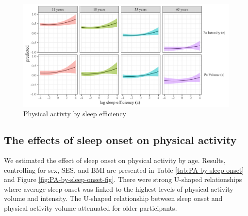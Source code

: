 \documentclass[
  man]{apa6}
\begin{document}
\begin{figure}
\includegraphics[width=1.1\linewidth]{../Figures/Pa on sleep_efficiency_lag} \caption{Physical activty by sleep efficiency}\label{fig:PA-by-sleep-efficiency-fig}
\end{figure}

\hypertarget{the-effects-of-sleep-onset-on-physical-activity}{%
\subsection{The effects of sleep onset on physical activity}\label{the-effects-of-sleep-onset-on-physical-activity}}

We estimated the effect of sleep onset on physical activity by age. Results, controlling for sex, SES, and BMI are presented in Table \ref{tab:PA-by-sleep-onset} and Figure \ref{fig:PA-by-sleep-onset-fig}. There were strong U-shaped relationships where average sleep onset was linked to the highest levels of physical activity volume and intensity. The U-shaped relationship between sleep onset and physical activity volume attenuated for older participants.
\end{document}
